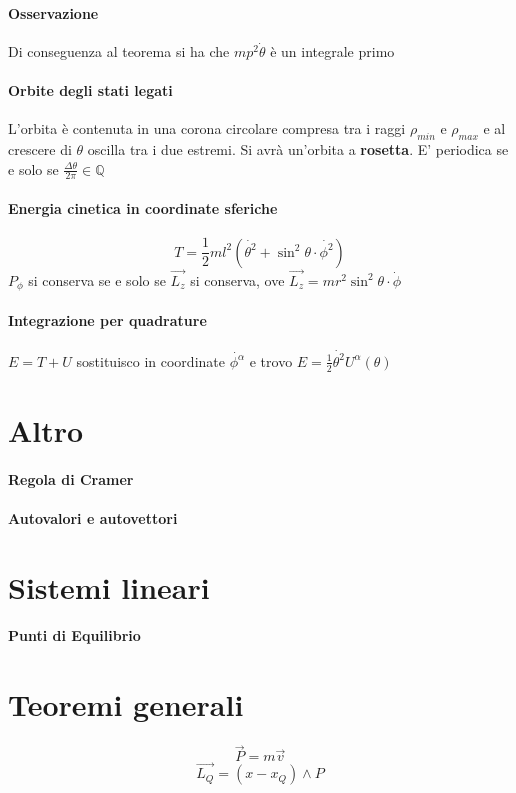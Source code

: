 \documentclass[a4paper,12pt]{article}
\begin{document}
\paragraph{Osservazione} Di conseguenza al teorema si ha che $mp^2\dot{\theta}$ è un integrale primo
\paragraph{Orbite degli stati legati}
L'orbita è contenuta in una corona circolare compresa tra i raggi $\rho_{min}$ e $\rho_{max}$ e al crescere di $\theta$ oscilla tra i due estremi. Si avrà un'orbita a \textbf{ rosetta}. E' periodica se e solo se $\frac{\Delta\theta}{2\pi}\in\mathbb{Q}$
\paragraph{Energia cinetica in coordinate sferiche}
\begin{displaymath}
T=\frac{1}{2}ml^2(\dot{\theta^2}+\sin^2\theta \cdot \dot{\phi^2})
\end{displaymath}
$P_{\phi}$ si conserva se e solo se $\vec{L_z}$ si conserva, ove $\vec{L_z}=mr^2\sin^2\theta\cdot\dot{\phi}$
\paragraph{Integrazione per quadrature}
$E=T+U$ sostituisco in coordinate $\dot{\phi^{\alpha}}$ e trovo $E=\frac{1}{2}\dot{\theta^2}U^{\alpha}(\theta)$

\section{Altro}
\paragraph{Regola di Cramer}
\paragraph{Autovalori e autovettori}

\section{Sistemi lineari}
\paragraph{Punti di Equilibrio}

\section{Teoremi generali}
\paragraph{}
$$
\vec{P} = m\vec{v}$$
$$
\vec{L_Q} = (x-x_Q)\wedge P
$$
\end{document}
